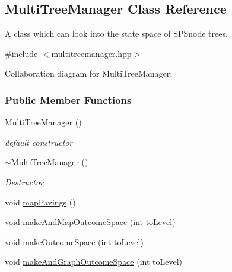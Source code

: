 \hypertarget{classMultiTreeManager}{\subsection{\-Multi\-Tree\-Manager \-Class \-Reference}
\label{classMultiTreeManager}
}


\-A class which can look into the state space of \-S\-P\-Snode trees.  




{\ttfamily \#include $<$multitreemanager.\-hpp$>$}



\-Collaboration diagram for \-Multi\-Tree\-Manager\-:
\subsubsection*{\-Public \-Member \-Functions}
\begin{DoxyCompactItemize}
\item 
\hyperlink{classMultiTreeManager_a4fb2b59dc74b9db44247340eee246948}{\-Multi\-Tree\-Manager} ()
\begin{DoxyCompactList}\small\item\em default constructor \end{DoxyCompactList}\item 
\hyperlink{classMultiTreeManager_a75d0b2730d19db22c94702097138c56a}{$\sim$\-Multi\-Tree\-Manager} ()
\begin{DoxyCompactList}\small\item\em \-Destructor. \end{DoxyCompactList}\item 
void \hyperlink{classMultiTreeManager_ae81995550988df35d1dcb7f0c14b5872}{map\-Pavings} ()
\item 
void \hyperlink{classMultiTreeManager_ab1524c6866c35ce2cafad068792ec5de}{make\-And\-Map\-Outcome\-Space} (int to\-Level)
\item 
void \hyperlink{classMultiTreeManager_a5feeb102bc4ffb52cf5fc11327499a1d}{make\-Outcome\-Space} (int to\-Level)
\item 
void \hyperlink{classMultiTreeManager_af09e6377690a9ebffc9b141532cb07b2}{make\-And\-Graph\-Outcome\-Space} (int to\-Level)
\end{DoxyCompactItemize}
